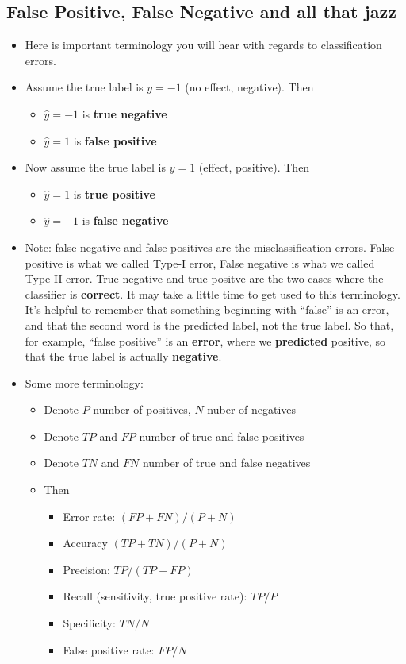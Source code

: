     \subsection{False Positive, False Negative and all that jazz}

    \begin{itemize}

  \item Here is important terminology you will hear with regards to
	classification errors.
    \item Assume the true label is $y=-1$ (no effect, negative).
      Then 
      \begin{itemize}
        \item  $\hat{y}=-1$ is {\bf true negative}
        \item  $\hat{y}=1$ is {\bf false positive}
      \end{itemize}
    \item Now assume the true label is $y=1$ (effect, positive).
      Then
      \begin{itemize}
        \item $\hat{y}=1$ is {\bf true positive}
        \item $\hat{y}=-1$ is {\bf false negative}
      \end{itemize}
    \item Note: false negative and false positives are the misclassification
      errors. False positive is what we called Type-I error, False negative is
      what we called Type-II error. True negative and true positve are the two
      cases where the classifier is {\bf correct}. It may take a little time to
      get used to this terminology. It's helpful to remember that something
      beginning with ``false'' is an error, and that the second word is the
      predicted label, not the true label. So that, for example, ``false
      positive'' is an {\bf error}, where we {\bf predicted} positive, so that the true
      label is actually {\bf negative}.

    \item Some more terminology:
    \begin{itemize}
     \item Denote $P$ number of positives, $N$ nuber of negatives
     \item Denote $TP$ and $FP$ number of true and false positives
\item Denote $TN$ and $FN$ number of true and false negatives
\item Then
  \begin{itemize}
    \item Error rate: $(FP+FN)/(P+N)$
    \item Accuracy $(TP+TN)/(P+N)$
    \item Precision: $TP/(TP+FP)$
    \item Recall (sensitivity, true positive rate): $TP/P$
    \item Specificity: $TN/N$
    \item False positive rate: $FP/N$
  \end{itemize}

   \end{itemize}
    \end{itemize}
 

